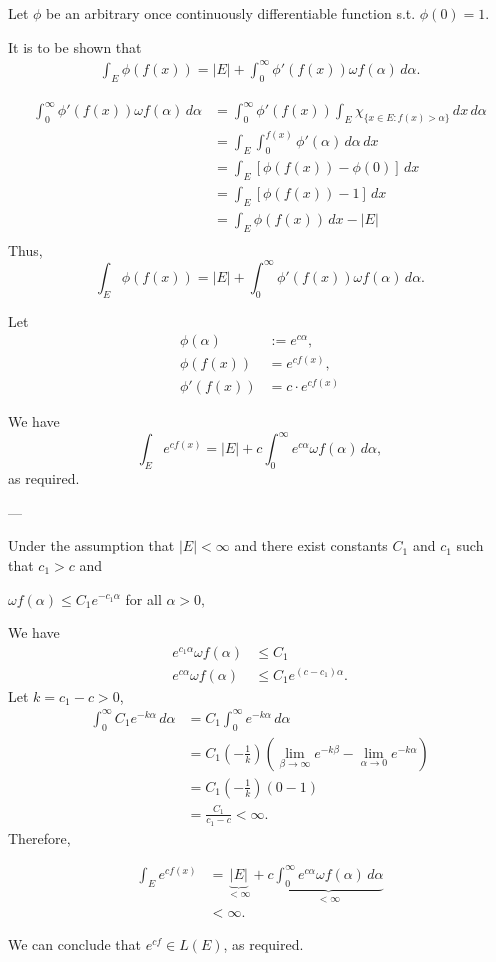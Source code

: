 \documentclass[UTF8,a4paper,10pt]{article}
\begin{document}
Let \(\phi\) be an arbitrary once continuously differentiable function s.t. \(\phi(0) = 1\).

It is to be shown that
\begin{align*}
  \int_E \phi(f(x)) = |E| + \int_0^\infty \phi'(f(x))\omega f(\alpha) \,d\alpha.
\end{align*}

\begin{align*}
  \int_0^\infty \phi'(f(x))\omega f(\alpha) \,d\alpha 
  &= \int_0^\infty \phi'(f(x))\int_E \chi_{ \{ x \in E : f(x) > \alpha \} }\,dx \,d\alpha\\
  &= \int_E \int_0^{f(x)} \phi'(\alpha)\,d\alpha\,dx \\
  &= \int_E \left[\phi(f(x))-\phi(0)\right]\,dx \\
  &= \int_E \left[\phi(f(x))-1\right]\,dx \\
  &= \int_E \phi(f(x))\,dx - |E| \\
\end{align*}
Thus,
\[  \int_E \phi(f(x)) = |E| + \int_0^\infty \phi'(f(x))\omega f(\alpha) \,d\alpha.\]



Let 
\begin{align*}
  \phi(\alpha) &:= e^{c\alpha},\\
  \phi(f(x)) &= e^{cf(x)},\\
  \phi'(f(x)) &= c\cdot e^{cf(x)}
\end{align*}

We have
\[
\int_E e^{cf(x)}  = |E| + c \int_0^\infty e^{c\alpha} \omega f(\alpha) \,d\alpha,
\]
as required.

---

Under the assumption that
$|E| < \infty$ and there exist constants $C_1$ and $c_1$ such that $c_1 > c$ and 

$\omega f(\alpha) \leq C_1e^{-c_1\alpha}$ for all $\alpha > 0,$

We have 
\begin{align*}
  e^{c_1\alpha}\omega f(\alpha) &\leq C_1\\
  e^{c\alpha}\omega f(\alpha) &\leq C_1  e^{(c-c_1)\alpha}.
\end{align*}
Let \(k = c_1-c  > 0\),
\begin{align*}
  \int_{0}^{\infty} C_1 e^{-k\alpha}\,d\alpha &= C_1 \int_{0}^{\infty}  e^{-k\alpha}\,d\alpha\\
  & = C_1 \left(-\frac{1}{k}\right)\left(\lim_{\beta\to \infty} e^{-k\beta} - \lim_{\alpha\to 0} e^{-k\alpha}  \right)\\
  & = C_1 \left(-\frac{1}{k} \right)\left(0-1\right)\\
  & = \frac{C_1}{c_1-c}<\infty.
\end{align*}
Therefore, 

\begin{align*}
  \int_E e^{cf(x)}  &= \underset{<\infty}{\underbrace{|E|}} + c \underset{<\infty}{\underbrace{\int_0^\infty e^{c\alpha} \omega f(\alpha) \,d\alpha}}\\
  &<\infty.
\end{align*}

We can conclude that \(e^{cf}\in L(E)\), as required.
\end{document}
